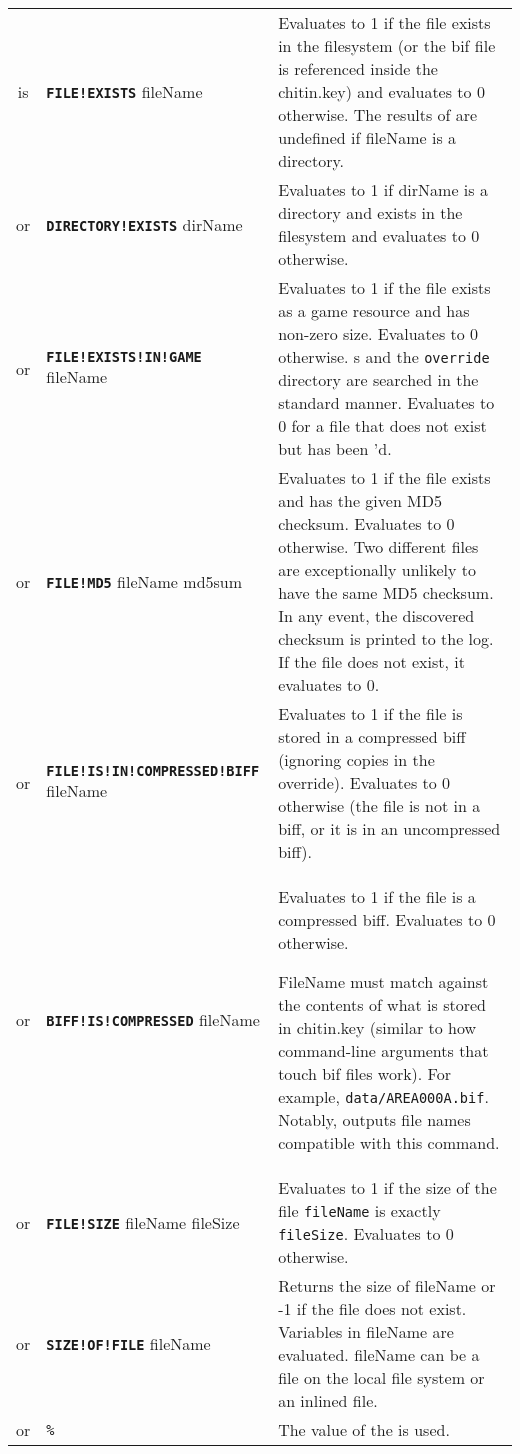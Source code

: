 \documentclass{article}
\def\ttref#1{\ahrefloc{#1}{\tt #1}}
\def\DEFINE#1{{\tt \bf #1}\label{#1}\index{#1}}
\def\t#1{{\tt #1}}
\begin{document}
\begin{tabular}{cp{10in}|p{10in}}
is & \DEFINE{FILE!EXISTS} fileName & Evaluates to 1 if the file exists in the
filesystem (or the bif file is referenced inside
the chitin.key) and evaluates to 0 otherwise.
The results of \ttref{FILE!EXISTS} are undefined if fileName is a directory.
\\
or & \DEFINE{DIRECTORY!EXISTS} dirName & Evaluates to 1 if dirName is a
directory and exists in the filesystem and evaluates to 0 otherwise.
\\
or & \DEFINE{FILE!EXISTS!IN!GAME} fileName & Evaluates to 1 if the file
exists as a game resource and has non-zero size. Evaluates to 0 otherwise.
\ttref{BIFF}s and the \t{override} directory are searched in the standard
manner. Evaluates to 0 for a file that does not exist but has been
\ttref{ALLOW!MISSING}'d.\\
or & \DEFINE{FILE!MD5} fileName md5sum & Evaluates to 1 if the file exists
and has the given MD5 checksum. Evaluates to 0 otherwise. Two different
files are exceptionally unlikely to have the same MD5 checksum. In any
event, the discovered checksum is printed to the log. If the file does not
exist, it evaluates to 0. \\
or & \DEFINE{FILE!IS!IN!COMPRESSED!BIFF} fileName & Evaluates to 1 if the file
is stored in a compressed biff (ignoring copies in the override). Evaluates to
0 otherwise (the file is not in a biff, or it is in an uncompressed biff).
\\
or & \DEFINE{BIFF!IS!COMPRESSED} fileName & Evaluates to 1 if the file
is a compressed biff. Evaluates to 0 otherwise.

FileName must match against the contents of what is stored in chitin.key
(similar to how command-line arguments that touch bif files work). For
example, \verb+data/AREA000A.bif+. Notably, \ttref{SOURCE!BIFF} outputs
file names compatible with this command.
\\
or & \DEFINE{FILE!SIZE} fileName fileSize & Evaluates to 1 if the
size of the file \t{fileName} is exactly \t{fileSize}. Evaluates to 0
otherwise. \\

or & \DEFINE{SIZE!OF!FILE} fileName &
Returns the size of fileName or -1 if the file does not exist. Variables in
fileName are evaluated. fileName can be a file on the local file system or an
inlined file.
\\

or & \t{\%}\ttref{variable}\t{\%}   &
    The value of the \ttref{variable} is used. \\


\end{tabular}
\end{document}
